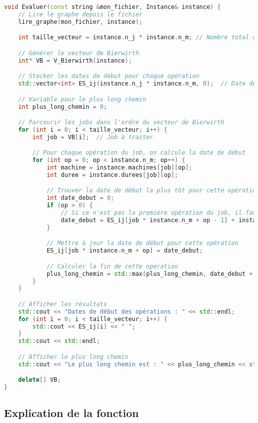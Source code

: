 \documentclass[a4paper,12pt]{article}
\begin{document}
\begin{lstlisting}[language=C++]
void Evaluer(const string &mon_fichier, Instance& instance) {
    // Lire le graphe depuis le fichier
    lire_graphe(mon_fichier, instance);

    int taille_vecteur = instance.n_j * instance.n_m; // Nombre total d'opérations

    // Générer le vecteur de Bierwirth
    int* VB = V_Bierwirth(instance);

    // Stocker les dates de début pour chaque opération
    std::vector<int> ES_ij(instance.n_j * instance.n_m, 0);  // Date de début des opérations

    // Variable pour le plus long chemin
    int plus_long_chemin = 0;

    // Parcourir les jobs dans l'ordre du vecteur de Bierwirth
    for (int i = 0; i < taille_vecteur; i++) {
        int job = VB[i];  // Job à traiter

        // Pour chaque opération du job, on calcule la date de début
        for (int op = 0; op < instance.n_m; op++) {
            int machine = instance.machines[job][op];
            int duree = instance.durees[job][op];

            // Trouver la date de début la plus tôt pour cette opération
            int date_debut = 0;
            if (op > 0) {
                // Si ce n'est pas la première opération du job, il faut attendre que l'opération précédente soit terminée
                date_debut = ES_ij[job * instance.n_m + op - 1] + instance.durees[job][op - 1];
            }

            // Mettre à jour la date de début pour cette opération
            ES_ij[job * instance.n_m + op] = date_debut;

            // Calculer la fin de cette opération
            plus_long_chemin = std::max(plus_long_chemin, date_debut + duree);
        }
    }

    // Afficher les résultats
    std::cout << "Dates de début des opérations : " << std::endl;
    for (int i = 0; i < taille_vecteur; i++) {
        std::cout << ES_ij[i] << " ";
    }
    std::cout << std::endl;

    // Afficher le plus long chemin
    std::cout << "Le plus long chemin est : " << plus_long_chemin << std::endl;

    delete[] VB;
}
\end{lstlisting}

\subsection{Explication de la fonction}
\end{document}
